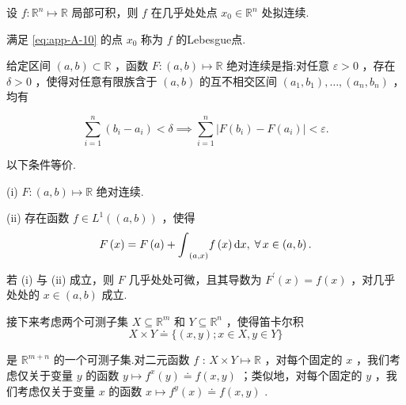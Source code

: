 \begin{theorem}[Lebesgue]\label{thm:app-A-11}
设 $f : {\mathbb{R}}^{n} \mapsto  \mathbb{R}$ 局部可积，则 $f$ 在几乎处处点 ${x}_{0} \in  {\mathbb{R}}^{n}$ 处拟连续.
\end{theorem}

满足 \eqref{eq:app-A-10} 的点 ${x}_{0}$ 称为 $f$ 的Lebesgue点.

给定区间 $\left(  {a,b}\right)   \subset  \mathbb{R}$ ，函数 $F : \left(  {a,b}\right)   \mapsto  \mathbb{R}$ 绝对连续是指:对任意 $\varepsilon  > 0$ ，存在 $\delta  > 0$ ，使得对任意有限族含于 $\left(  {a,b}\right)$ 的互不相交区间 $\left(  {{a}_{1},{b}_{1}}\right)  ,\ldots ,\left(  {{a}_{n},{b}_{n}}\right)$ ，均有

\[
\sum_{{i = 1}}^{n}\left( {{b}_{i} - {a}_{i}}\right)  < \delta \implies\sum_{{i = 1}}^{n}\left| {F\left( {b}_{i}\right)  - F\left( {a}_{i}\right) }\right|  < \varepsilon .
\]

\begin{theorem}[绝对连续函数]\label{thm:app-A-12}
以下条件等价.

(i) $F : \left(  {a,b}\right)   \mapsto  \mathbb{R}$ 绝对连续.

(ii) 存在函数 $f \in  {L}^{1}\left( \left(  {a,b}\right)  \right)$ ，使得
\[
F\left( x\right)  = F\left( a\right)  + {\int }_{\left(  a,x\right)  }f\left( x\right) {\mathop{}\!\mathrm{d} x},\;\forall\,x \in  \left(  {a,b}\right)  .
\]

若 (i) 与 (ii) 成立，则 $F$ 几乎处处可微，且其导数为 ${F}^{\prime }\left( x\right)  = f\left( x\right)$ ，对几乎处处的 $x \in  \left(  {a,b}\right)$ 成立.
\end{theorem}

接下来考虑两个可测子集 $X \subseteq  {\mathbb{R}}^{m}$ 和 $Y \subseteq  {\mathbb{R}}^{n}$ ，使得笛卡尔积
\[
X \times  Y \doteq  \{ \left( {x,y}\right) ;x \in  X,y \in  Y\}
\]

是 ${\mathbb{R}}^{m + n}$ 的一个可测子集.对二元函数 $f$ : $X \times  Y \mapsto  \mathbb{R}$ ，对每个固定的 $x$ ，我们考虑仅关于变量 $y$ 的函数 $y \mapsto  {f}^{x}\left( y\right)  \doteq  f\left( {x,y}\right)$ ；类似地，对每个固定的 $y$ ，我们考虑仅关于变量 $x$ 的函数 $x \mapsto  {f}^{y}\left( x\right)  \doteq  f\left( {x,y}\right)$ .

